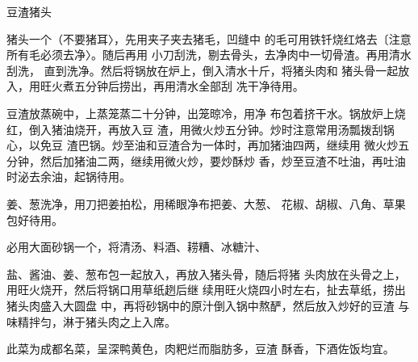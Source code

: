 \begin{recipe}{豆渣猪头}

\ingredients


\cooking

\step 猪头一个（不要猪耳〉，先用夹子夹去猪毛，凹缝中 的毛可用铁钎烧红烙去〔注意所有毛必须去净〉。随后再用 小刀刮洗，剔去骨头，去净肉中一切骨渣。再用清水刮洗， 直到洗净。然后将锅放在炉上，倒入清水十斤，将猪头肉和 猪头骨一起放入，用旺火煮五分钟后捞出，再用清水全部刮 冼干净待用。

\step 豆渣放蒸碗中，上蒸笼蒸二十分钟，出笼晾冷，用净 布包着挤干水。锅放炉上烧红，倒入猪油烧开，再放入豆 渣，用微火炒五分钟。炒时注意常用汤瓢拨刮锅心，以免豆 渣巴锅。炒至油和豆渣合为一体时，再加猪油四两，继续用 微火炒五分钟，然后加猪油二两，继续用微火炒，要炒酥炒 香，炒至豆渣不吐油，再吐油时泌去余油，起锅待用。

\step 姜、葱洗净，用刀把姜拍松，用稀眼净布把姜、大葱、 花椒、胡椒、八角、草果包好待用。

必用大面砂锅一个，将清汤、料酒、耢糟、冰糖汁、

盐、酱油、姜、葱布包一起放入，再放入猪头骨，随后将猪 头肉放在头骨之上，用旺火烧开，然后将锅口用草纸趔后继 续用旺火烧四小时左右，扯去草纸，捞出猪头肉盛入大圆盘 中，再将砂锅中的原汁倒入锅中熬酽，然后放入炒好的豆渣 与味精拌匀，淋于猪头肉之上入席。

\notes

此菜为成都名菜，呈深鸭黄色，肉粑烂而脂肪多，豆渣 酥香，下酒佐饭均宜。

\end{recipe}


